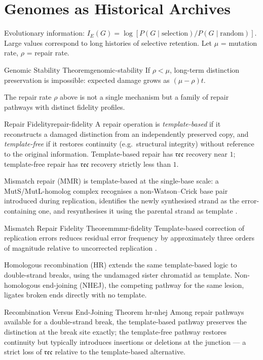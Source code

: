 \documentclass[12pt,twoside,openright]{book}
\newcommand{\reco}{\mathfrak{rec}}
\begin{document}
\section{Genomes as Historical Archives}

Evolutionary information:
$I_E(G) = \log[P(G \mid \text{selection})/P(G \mid \text{random})]$.
Large values correspond to long histories of selective
retention. Let $\mu$ = mutation rate, $\rho$ = repair rate.

\begin{theorem}{Genomic Stability Theorem}{genomic-stability}
  If $\rho < \mu$, long-term distinction preservation
  is impossible: expected damage grows as $(\mu-\rho)t$.
\end{theorem}

The repair rate $\rho$ above is not a single mechanism but a
family of repair pathways with distinct fidelity profiles.

\begin{definition}{Repair Fidelity}{repair-fidelity}
  A repair operation is \emph{template-based} if it
  reconstructs a damaged distinction from an independently
  preserved copy, and \emph{template-free} if it restores
  continuity (e.g.\ structural integrity) without reference to
  the original information. Template-based repair has
  $\reco$ recovery near $1$; template-free repair has
  $\reco$ recovery strictly less than $1$.
\end{definition}

Mismatch repair (MMR) is template-based at the single-base
scale: a MutS/MutL-homolog complex recognises a non-Watson--Crick
base pair introduced during replication, identifies the newly
synthesised strand as the error-containing one, and resynthesises
it using the parental strand as template \parencite{modrich2006}.

\begin{theorem}{Mismatch Repair Fidelity Theorem}{mmr-fidelity}
  Template-based correction of replication errors reduces
  residual error frequency by approximately three orders of
  magnitude relative to uncorrected replication
  \parencite{modrich2006}.
\end{theorem}

Homologous recombination (HR) extends the same template-based
logic to double-strand breaks, using the undamaged sister
chromatid as template. Non-homologous end-joining (NHEJ), the
competing pathway for the same lesion, ligates broken ends
directly with no template.

\begin{theorem}{Recombination Versus End-Joining Theorem}%
  {hr-nhej}
  Among repair pathways available for a double-strand break,
  the template-based pathway preserves the distinction at the
  break site exactly; the template-free pathway restores
  continuity but typically introduces insertions or deletions
  at the junction --- a strict loss of $\reco$ relative to the
  template-based alternative.
\end{theorem}
\end{document}
